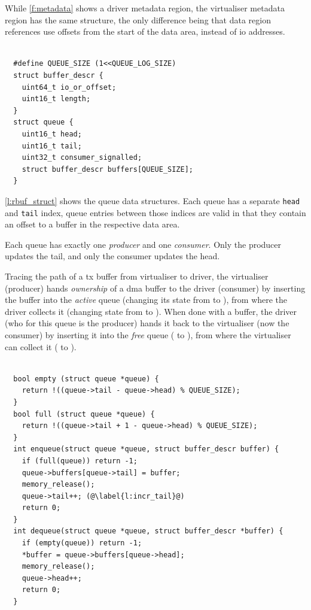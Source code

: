 \documentclass[a4paper,12pt]{report}
\newcommand*\circled[1]{\tikz[baseline=(char.base)]{
            \node[shape=circle,draw,inner sep=0pt,thick] (char) {#1};}}
\newcommand{\code}[1]{\texttt{#1}}
\begin{document}
While \autoref{f:metadata} shows a driver metadata region, the virtualiser
metadata region has the same structure, the only difference being that
data region references use offsets from the start of the data area,
instead of \gls{io} addresses.

\begin{lstlisting}[gobble=2,firstline=2,float=th,tabsize=2,
  label={l:rbuf_struct},
  caption={Control region queue data structures.}]

  #define QUEUE_SIZE (1<<QUEUE_LOG_SIZE)
  struct buffer_descr {
    uint64_t io_or_offset;
    uint16_t length;
  }
  struct queue {
    uint16_t head;
    uint16_t tail;
    uint32_t consumer_signalled;
    struct buffer_descr buffers[QUEUE_SIZE];
  }
\end{lstlisting}

\autoref{l:rbuf_struct} shows the queue data structures.
Each queue has a separate \code{head} and \code{tail} index,
queue entries between those indices are valid in that they
contain an offset to a buffer in the respective data area.

Each queue has exactly one \emph{producer} and one
\emph{consumer}. Only the producer updates the tail, and
only the consumer updates the head.

Tracing the path of a \gls{tx} buffer from virtualiser to driver, the virtualiser (producer) hands
\emph{ownership} of a \gls{dma} buffer to the driver (consumer) by inserting the buffer into the \emph{active}
queue (changing its state from \circled{\ref{st:so_u}} to \circled{\ref{st:do_i}}), from where
the driver collects it (changing state from \circled{\ref{st:do_i}} to \circled{\ref{st:do_u}}). When done with a buffer,
the driver (who for this queue is the producer) hands it back to the virtualiser (now the consumer) by inserting it into the
\emph{free} queue (\circled{\ref{st:do_u}} to \circled{\ref{st:so_i}}), from where the virtualiser
can collect it (\circled{\ref{st:so_i}} to \circled{\ref{st:so_u}}).

\begin{lstlisting}[gobble=2,firstline=2,float=th,tabsize=2,
  label={l:rbuf_use},
  caption={Control-region queue management. }]

  bool empty (struct queue *queue) {
    return !((queue->tail - queue->head) % QUEUE_SIZE);
  }
  bool full (struct queue *queue) {
    return !((queue->tail + 1 - queue->head) % QUEUE_SIZE);
  }
  int enqueue(struct queue *queue, struct buffer_descr buffer) {
    if (full(queue)) return -1;
    queue->buffers[queue->tail] = buffer;
    memory_release();
    queue->tail++; (@\label{l:incr_tail}@)
    return 0;
  }
  int dequeue(struct queue *queue, struct buffer_descr *buffer) {
    if (empty(queue)) return -1;
    *buffer = queue->buffers[queue->head];
    memory_release();
    queue->head++;
    return 0;
  }
\end{lstlisting}
\end{document}
